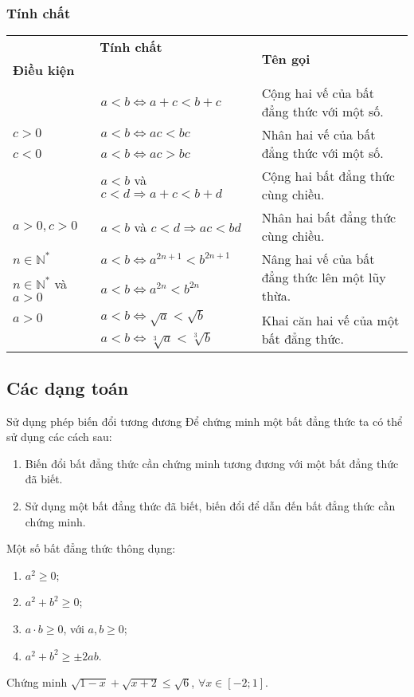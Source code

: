 \subsubsection{Tính chất}
\begin{longtable}{|p{4cm}|p{7cm}|p{5cm}|}
\hline
\multicolumn{2}{|c|}{\textbf{Tính chất}}&\multirow{2}{5cm}{\centering\textbf{Tên gọi}}\\
\cline{1-2}
\centering\textbf{Điều kiện}&\centering{\textbf{Nội dung}}&\\
\hline
&$a<b\Leftrightarrow a+c<b+c$&Cộng hai vế của bất đẳng thức với một số.\\
\hline
$c>0$&$a<b\Leftrightarrow ac<bc$&\multirow{2}{5cm}{Nhân hai vế của bất đẳng thức với một số.}\\
\cline{1-2}
$c<0$&$a<b\Leftrightarrow ac>bc$&\\
\hline
&$a<b$ và $c<d\Rightarrow a+c<b+d$&Cộng hai bất đẳng thức cùng chiều.\\
\hline
$a>0,c>0$&$a<b$ và $c<d\Rightarrow ac<bd$&Nhân hai bất đẳng thức cùng chiều.\\
\hline
$n\in\mathbb{N^*}$&$a<b\Leftrightarrow a^{2n+1}<b^{2n+1}$&\multirow{2}{5cm}{Nâng hai vế của bất đẳng thức lên một lũy thừa.}\\
\cline{1-2}
$n\in\mathbb{N^*}$ và $a>0$&$a<b\Leftrightarrow a^{2n}<b^{2n}$&\\
\hline
$a>0$&$a<b\Leftrightarrow \sqrt{a}<\sqrt{b}$&\multirow{2}{5cm}{Khai căn hai vế của một bất đẳng thức.}\\
&$a<b\Leftrightarrow \sqrt[3]{a}<\sqrt[3]{b}$&\\
\hline
\end{longtable}
\subsection{Các dạng toán}
\begin{dang}{Sử dụng phép biến đổi tương đương}
Để chứng minh một bất đẳng thức ta có thể sử dụng các cách sau:
\begin{enumerate}[+]
	\item Biến đổi bất đẳng thức cần chứng minh tương đương với một bất đẳng thức đã biết.
	\item Sử dụng một bất đẳng thức đã biết, biến đổi để dẫn đến bất đẳng thức cần chứng minh.
\end{enumerate}
Một số bất đẳng thức thông dụng:
\begin{enumerate}[+]
	\item $a^2\ge 0$;
	\item $a^2+b^2\ge 0$;
	\item $a\cdot b\ge 0$, với $a,b\ge 0$;
	\item $a^2+b^2\ge \pm 2ab$.
\end{enumerate}
\end{dang}
\setcounter{vd}{0}
\begin{vd}%
Chứng minh $\sqrt{1-x}+\sqrt{x+2}\le \sqrt{6}$, $\forall x\in [-2;1]$.
\end{vd}


